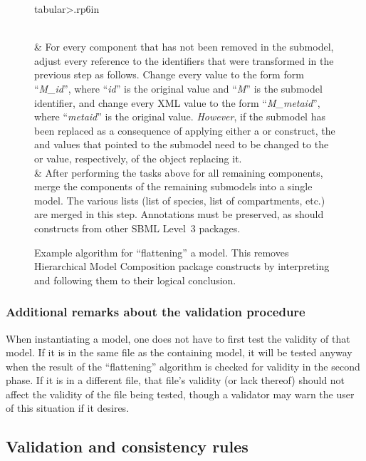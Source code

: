 \begin{figure}[thb]
\begin{edtable}{tabular}{>{\therownum.}rp{6in}}
\begin{enumerate}[label={\alph*})]
    \vspace*{-1em}
    \end{enumerate}
    \\
    & For every component that has not been removed in the submodel,
    adjust every reference to the identifiers that were transformed in
    the previous step as follows.  Change every  value
    to the form form ``\emph{M\_id}'', where ``\emph{id}'' is the
    original  value and ``\emph{M}'' is the submodel
    identifier, and change every XML  value to the form
    ``\emph{M\_metaid}'', where ``\emph{metaid}'' is the original
     value.  \emph{However}, if the submodel has been
    replaced as a consequence of applying either a \ReplacedElement or
    \ReplacedBy construct, the  and 
    values that pointed to the submodel need to be changed to the
     or  value, respectively, of the object
    replacing it.
    \\
    & After performing the tasks above for all remaining components,
    merge the components of the remaining submodels into a single model.
    The various lists (list of species, list of compartments, etc.) are
    merged in this step.  Annotations must be preserved, as should
    constructs from other SBML Level~3 packages.
    \\
    \bottomrule
  \end{edtable}
  \caption{Example algorithm for ``flattening'' a model.  This removes
    Hierarchical Model Composition package constructs by interpreting
    and following them to their logical conclusion.}
  \label{flattening-algo}
\end{figure}


\subsubsection{Additional remarks about the validation procedure}

When instantiating a model, one does not have to first test the validity
of that model.  If it is in the same file as the containing model, it
will be tested anyway when the result of the ``flattening'' algorithm is
checked for validity in the second phase.  If it is in a different file,
that file's validity (or lack thereof) should not affect the validity of
the file being tested, though a validator may warn the user of this
situation if it desires.


\subsection{Validation and consistency rules}
\label{validation-rules}

